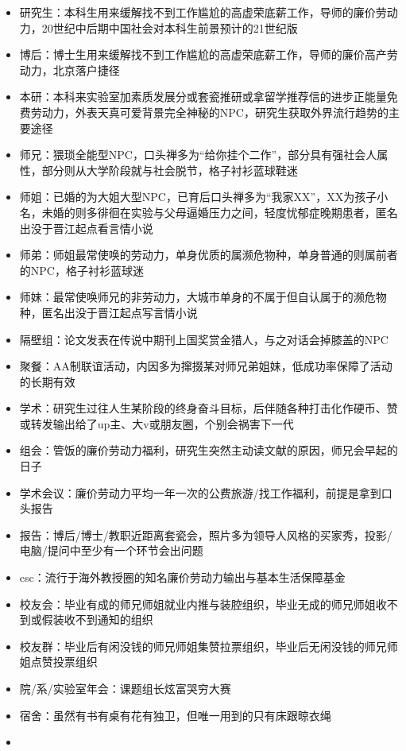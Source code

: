 \documentclass[]{tufte-book}
\providecommand{\tightlist}{%
  \setlength{\itemsep}{0pt}\setlength{\parskip}{0pt}}
\begin{document}
\begin{itemize}
\tightlist
\item
  研究生：本科生用来缓解找不到工作尴尬的高虚荣底薪工作，导师的廉价劳动力，20世纪中后期中国社会对本科生前景预计的21世纪版
\item
  博后：博士生用来缓解找不到工作尴尬的高虚荣底薪工作，导师的廉价高产劳动力，北京落户捷径
\item
  本研：本科来实验室加素质发展分或套瓷推研或拿留学推荐信的进步正能量免费劳动力，外表天真可爱背景完全神秘的NPC，研究生获取外界流行趋势的主要途径
\item
  师兄：猥琐全能型NPC，口头禅多为``给你挂个二作''，部分具有强社会人属性，部分则从大学阶段就与社会脱节，格子衬衫蓝球鞋迷
\item
  师姐：已婚的为大姐大型NPC，已育后口头禅多为``我家XX''，XX为孩子小名，未婚的则多徘徊在实验与父母逼婚压力之间，轻度忧郁症晚期患者，匿名出没于晋江起点看言情小说
\item
  师弟：师姐最常使唤的劳动力，单身优质的属濒危物种，单身普通的则属前者的NPC，格子衬衫蓝球迷
\item
  师妹：最常使唤师兄的非劳动力，大城市单身的不属于但自认属于的濒危物种，匿名出没于晋江起点写言情小说
\item
  隔壁组：论文发表在传说中期刊上国奖赏金猎人，与之对话会掉膝盖的NPC
\item
  聚餐：AA制联谊活动，内因多为撺掇某对师兄弟姐妹，低成功率保障了活动的长期有效
\item
  学术：研究生过往人生某阶段的终身奋斗目标，后伴随各种打击化作硬币、赞或转发输出给了up主、大v或朋友圈，个别会祸害下一代
\item
  组会：管饭的廉价劳动力福利，研究生突然主动读文献的原因，师兄会早起的日子
\item
  学术会议：廉价劳动力平均一年一次的公费旅游/找工作福利，前提是拿到口头报告
\item
  报告：博后/博士/教职近距离套瓷会，照片多为领导人风格的买家秀，投影/电脑/提问中至少有一个环节会出问题
\item
  csc：流行于海外教授圈的知名廉价劳动力输出与基本生活保障基金
\item
  校友会：毕业有成的师兄师姐就业内推与装腔组织，毕业无成的师兄师姐收不到或假装收不到通知的组织
\item
  校友群：毕业后有闲没钱的师兄师姐集赞拉票组织，毕业后无闲没钱的师兄师姐点赞投票组织
\item
  院/系/实验室年会：课题组长炫富哭穷大赛
\item
  宿舍：虽然有书有桌有花有独卫，但唯一用到的只有床跟晾衣绳
\item

\end{itemize}
\end{document}
